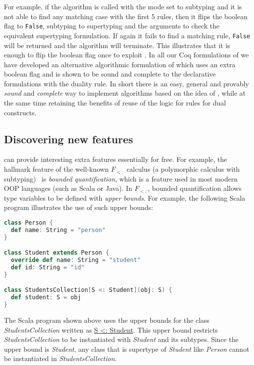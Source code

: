 For example, if the algorithm is called with the mode set to subtyping and
it is not able to find any matching case with the first 5 rules, then it flips the boolean
flag to \verb|False|, subtyping to supertyping and the arguments to check the
equivalent supertyping formulation.  If again it fails to find a matching rule,
\verb|False| will be returned and the algorithm will
terminate.  This illustrates that it is enough to flip the boolean
flag once to exploit \nameduo. In all our Coq
formulations of \nameduo we have developed an alternative
algorithmic formulation of \nameduo which uses an extra boolean flag and is shown
to be sound and complete to the declarative formulations with the duality rule.
In short there is an easy, general and provably \emph{sound} and
\emph{complete} way to implement algorithms based on the idea of
\nameduo, while at the same time retaining the benefits
of reuse of the logic for rules for dual constructs.


\subsection{Discovering new features}
\label{sec:overview:4}

\noindent \nameduo can provide interesting extra features essentially for free. 
For example,
the hallmark feature of the well-known $F_{<:}$ calculus 
(a polymorphic calculus with subtyping)~\citep{canning1989f} is \emph{bounded quantification},
which is a feature used in most modern OOP languages (such as Scala or Java). 
In $F_{<:}$, bounded quantification allows type variables to be defined with \emph{upper bounds}.
For example, the following Scala program illustrates the use of such upper bounds:

\begin{lstlisting}[language=Scala]
class Person {
  def name: String = "person"
}

class Student extends Person {
  override def name: String = "student"
  def id: String = "id"
}

class StudentsCollection[S <: Student](obj: S) {
  def student: S = obj
}
\end{lstlisting}

\noindent The Scala program shown above uses the upper bounds for the class \emph{StudentsCollection} written as \underline{S <: Student}.
This upper bound restricts \emph{StudentsCollection} to be
instantiated 
with \emph{Student} and its subtypes. Since the upper bound is \emph{Student},
any class that is supertype of \emph{Student} like \emph{Person}
cannot be instantiated in \emph{StudentsCollection}.

